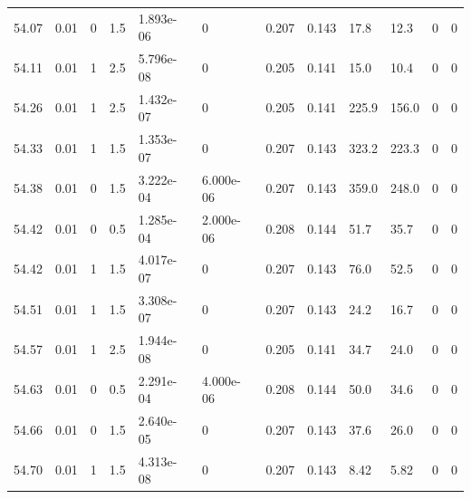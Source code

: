 \documentclass[preview]{standalone}
\begin{document}
{{{{{{{{{{{{{{{{{\begin{tabular}{L{1.2cm}C{1.2cm} C{0.3cm}C{0.5cm} C{1.4cm}C{1.4cm} C{1.4cm}C{1.4cm} C{1.6cm}C{1.6cm} C{1.6cm}C{1.6cm}}
  54.07  &  0.01  & 0     & 1.5 &  1.893e-06  & 0  &  0.207&   0.143& 17.8 & 12.3   &  0 & 0  \\ 
  54.11  &  0.01  & 1     & 2.5 &  5.796e-08  & 0  &  0.205&   0.141& 15.0 & 10.4   &  0 & 0  \\ 
  54.26  &  0.01  & 1     & 2.5 &  1.432e-07  & 0  &  0.205&   0.141& 225.9 & 156.0   &  0 & 0  \\ 
  54.33  &  0.01  & 1     & 1.5 &  1.353e-07  & 0  &  0.207&   0.143& 323.2 & 223.3   &  0 & 0  \\ 
  54.38  &  0.01  & 0     & 1.5 &  3.222e-04  & 6.000e-06  &  0.207&   0.143& 359.0 & 248.0   &  0 & 0  \\ 
  54.42  &  0.01  & 0     & 0.5 &  1.285e-04  & 2.000e-06  &  0.208&   0.144& 51.7 & 35.7   &  0 & 0  \\ 
  54.42  &  0.01  & 1     & 1.5 &  4.017e-07  & 0  &  0.207&   0.143& 76.0 & 52.5   &  0 & 0  \\ 
  54.51  &  0.01  & 1     & 1.5 &  3.308e-07  & 0  &  0.207&   0.143& 24.2 & 16.7   &  0 & 0  \\ 
  54.57  &  0.01  & 1     & 2.5 &  1.944e-08  & 0  &  0.205&   0.141& 34.7 & 24.0   &  0 & 0  \\ 
  54.63  &  0.01  & 0     & 0.5 &  2.291e-04  & 4.000e-06  &  0.208&   0.144& 50.0 & 34.6   &  0 & 0  \\ 
  54.66  &  0.01  & 0     & 1.5 &  2.640e-05  & 0  &  0.207&   0.143& 37.6 & 26.0   &  0 & 0  \\ 
  54.70  &  0.01  & 1     & 1.5 &  4.313e-08  & 0  &  0.207&   0.143& 8.42 & 5.82   &  0 & 0  \\ 
\hline 
\end{tabular} 

}}}}}}}}}}}}}}}}}
\end{document}
